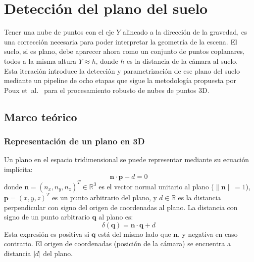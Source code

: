 %

\section{Detección del plano del suelo}
\label{sec:lm-ground-estimator}

Tener una nube de puntos con el eje $Y$ alineado a la dirección de la
gravedad, es una corrección necesaria para poder interpretar la
geometría de la escena. El suelo, si es plano, debe aparecer ahora como un
conjunto de puntos coplanares, todos a la misma altura $Y \approx h$, donde
$h$ es la distancia de la cámara al suelo. Esta iteración introduce la
detección y parametrización de ese plano del suelo mediante un pipeline de
ocho etapas que sigue la metodología propuesta por Poux et~al.\ \cite{Poux2019voxel, Poux2020segmentation} para el
procesamiento robusto de nubes de puntos 3D.

\subsection{Marco teórico}

\subsubsection{Representación de un plano en 3D}

Un plano en el espacio tridimensional se puede representar mediante su
ecuación implícita:
\begin{equation}
  \label{eq:plane-implicit}
  \mathbf{n} \cdot \mathbf{p} + d = 0
\end{equation}
donde $\mathbf{n} = (n_x, n_y, n_z)^T \in \mathbb{R}^3$ es el vector
normal unitario al plano ($\lVert\mathbf{n}\rVert = 1$),
$\mathbf{p} = (x, y, z)^T$ es un punto arbitrario del plano, y $d \in
\mathbb{R}$ es la distancia perpendicular con signo del origen de coordenadas al
plano. La distancia con signo de un punto arbitrario $\mathbf{q}$ al plano es:
\begin{equation}
  \label{eq:point-plane-dist}
  \delta(\mathbf{q}) = \mathbf{n} \cdot \mathbf{q} + d
\end{equation}
Esta expresión es positiva si $\mathbf{q}$ está del mismo lado que
$\mathbf{n}$, y negativa en caso contrario. El origen de coordenadas
(posición de la cámara) se encuentra a distancia $|d|$ del plano.


